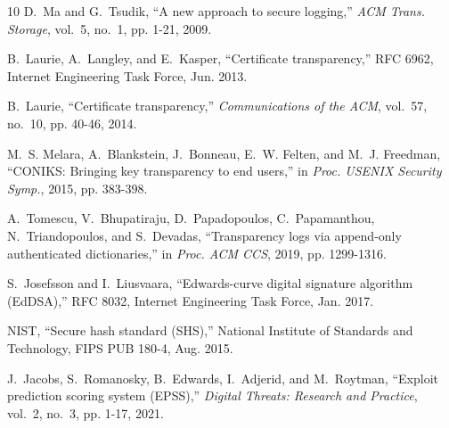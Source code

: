 \documentclass[journal]{IEEEtran}
\begin{document}
\begin{thebibliography}{10}
D.~Ma and G.~Tsudik, ``A new approach to secure logging,'' \emph{ACM Trans.
Storage}, vol.~5, no.~1, pp. 1-21, 2009.

B.~Laurie, A.~Langley, and E.~Kasper, ``Certificate transparency,'' RFC 6962,
Internet Engineering Task Force, Jun. 2013.

B.~Laurie, ``Certificate transparency,'' \emph{Communications of the ACM},
vol.~57, no.~10, pp. 40-46, 2014.

M.~S. Melara, A.~Blankstein, J.~Bonneau, E.~W. Felten, and M.~J. Freedman,
``{CONIKS}: Bringing key transparency to end users,'' in \emph{Proc. USENIX
Security Symp.}, 2015, pp. 383-398.

A.~Tomescu, V.~Bhupatiraju, D.~Papadopoulos, C.~Papamanthou, N.~Triandopoulos,
and S.~Devadas, ``Transparency logs via append-only authenticated
dictionaries,'' in \emph{Proc. ACM CCS}, 2019, pp. 1299-1316.

S.~Josefsson and I.~Liusvaara, ``Edwards-curve digital signature algorithm
(EdDSA),'' RFC 8032, Internet Engineering Task Force, Jan. 2017.

{NIST}, ``Secure hash standard (SHS),'' National Institute of Standards and
Technology, FIPS PUB 180-4, Aug. 2015.

J.~Jacobs, S.~Romanosky, B.~Edwards, I.~Adjerid, and M.~Roytman, ``Exploit
prediction scoring system (EPSS),'' \emph{Digital Threats: Research and
Practice}, vol.~2, no.~3, pp. 1-17, 2021.

\end{thebibliography}
\end{document}
